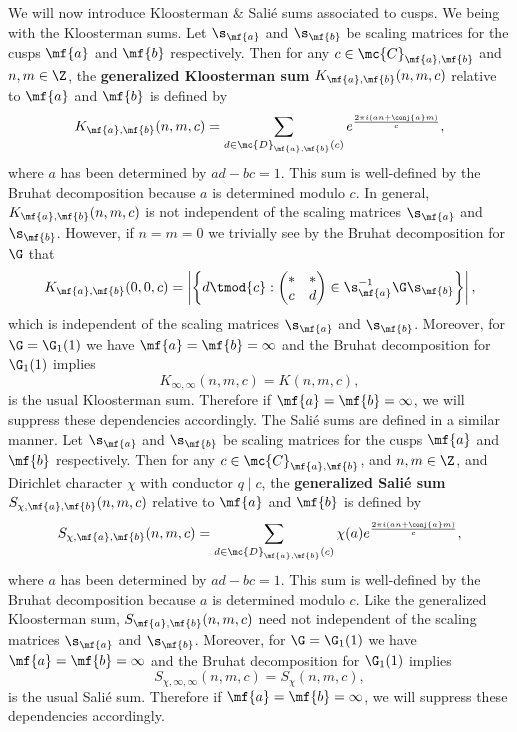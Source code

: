       We will now introduce Kloosterman \& Sali\'e sums associated to cusps. We being with the Kloosterman sums. Let $\s_{\mf{a}}$ and $\s_{\mf{b}}$ be scaling matrices for the cusps $\mf{a}$ and $\mf{b}$ respectively. Then for any $c \in \mc{C}_{\mf{a},\mf{b}}$ and $n,m \in \Z$, the \textbf{generalized Kloosterman sum} $K_{\mf{a},\mf{b}}(n,m,c)$ relative to $\mf{a}$ and $\mf{b}$ is defined by
      \[
        K_{\mf{a},\mf{b}}(n,m,c) = \sum_{d \in \mc{D}_{\mf{a},\mf{b}}(c)}e^{\frac{2\pi i(an+\conj{a}m)}{c}},
      \]
      where $a$ has been determined by $ad-bc = 1$. This sum is well-defined by the Bruhat decomposition because $a$ is determined modulo $c$. In general, $K_{\mf{a},\mf{b}}(n,m,c)$ is not independent of the scaling matrices $\s_{\mf{a}}$ and $\s_{\mf{b}}$. However, if $n = m = 0$ we trivially see by the Bruhat decomposition for $\G$ that
      \[
        K_{\mf{a},\mf{b}}(0,0,c) = \left|\left\{d \tmod{c}:\begin{pmatrix} \ast & \ast \\ c & d \end{pmatrix} \in \s_{\mf{a}}^{-1}\G\s_{\mf{b}}\right\}\right|,
      \]
      which is independent of the scaling matrices $\s_{\mf{a}}$ and $\s_{\mf{b}}$. Moreover, for $\G = \G_{1}(1)$ we have $\mf{a} = \mf{b} = \infty$ and the Bruhat decomposition for $\G_{1}(1)$ implies
      \[
        K_{\infty,\infty}(n,m,c) = K(n,m,c),
      \]
      is the usual Kloosterman sum. Therefore if $\mf{a} = \mf{b} = \infty$, we will suppress these dependencies accordingly. The Sali\'e sums are defined in a similar manner. Let $\s_{\mf{a}}$ and $\s_{\mf{b}}$ be scaling matrices for the cusps $\mf{a}$ and $\mf{b}$ respectively. Then for any $c \in \mc{C}_{\mf{a},\mf{b}}$, and $n,m \in \Z$, and Dirichlet character $\chi$ with conductor $q \mid c$, the \textbf{generalized Sali\'e sum} $S_{\chi,\mf{a},\mf{b}}(n,m,c)$ relative to $\mf{a}$ and $\mf{b}$ is defined by
      \[
        S_{\chi,\mf{a},\mf{b}}(n,m,c) = \sum_{d \in \mc{D}_{\mf{a},\mf{b}}(c)}\chi(a)e^{\frac{2\pi i(an+\conj{a}m)}{c}},
      \]
      where $a$ has been determined by $ad-bc = 1$. This sum is well-defined by the Bruhat decomposition because $a$ is determined modulo $c$. Like the generalized Kloosterman sum, $S_{\mf{a},\mf{b}}(n,m,c)$ need not independent of the scaling matrices $\s_{\mf{a}}$ and $\s_{\mf{b}}$. Moreover, for $\G = \G_{1}(1)$ we have $\mf{a} = \mf{b} = \infty$ and the Bruhat decomposition for $\G_{1}(1)$ implies
      \[
        S_{\chi,\infty,\infty}(n,m,c) = S_{\chi}(n,m,c),
      \]
      is the usual Sali\'e sum. Therefore if $\mf{a} = \mf{b} = \infty$, we will suppress these dependencies accordingly.

